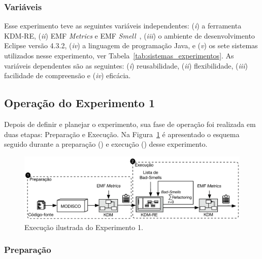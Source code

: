 \subsubsection{Variáveis}

Esse experimento teve as seguintes variáveis independentes: (\textit{i}) a ferramenta KDM-RE, (\textit{ii}) EMF \textit{Metrics} e EMF \textit{Smell}~\cite{Arendt_2012}, (\textit{iii}) o ambiente de desenvolvimento Eclipse versão 4.3.2, (\textit{iv}) a linguagem de programação Java, e (\textit{v}) os sete sistemas utilizados nesse experimento, ver Tabela~\ref{tab:sistemas_experimentos}. As variáveis dependentes são as seguintes: (\textit{i}) reusabilidade, (\textit{ii}) flexibilidade, (\textit{iii}) facilidade de compreensão e (\textit{iv}) eficácia.

\subsection{Operação do Experimento 1}

Depois de definir e planejar o experimento, sua fase de operação foi realizada em duas etapas: Preparação e Execução. Na Figura~\ref{fig:execucao_experimento} é apresentado o esquema seguido durante a preparação () e execução () desse experimento.

\begin{figure}[h]
	\centering
	\caption{Execução ilustrada do Experimento 1.}
	\label{fig:execucao_experimento}
	\includegraphics[scale=0.9]{images/Figura_Experimento}
	\fautor
\end{figure}

\subsubsection{Preparação}

